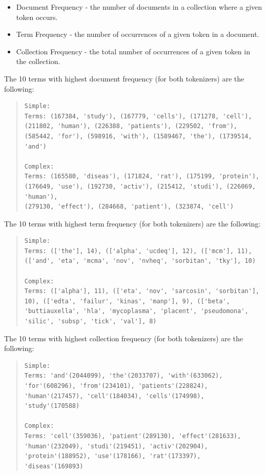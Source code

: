 \documentclass[12pt]{article}
\begin{document}
\begin{itemize}[leftmargin=*]
\setlength\itemsep{-0.3em}
\item Document Frequency - the number of documents in a collection where 
a given token occurs.
\item Term Frequency - the number of occurrences of a given token in a 
document.
\item Collection Frequency - the total number of occurrences of a given 
token in the collection.
\end{itemize}

The 10 terms with highest document frequency (for both tokenizers) are the 
following:

\begingroup
\addtolength\leftmargini{-0.4in}
\addtolength\baselineskip{-0.05in}
\begin{quote}
\begin{verbatim}
Simple:
Terms: (167384, 'study'), (167779, 'cells'), (171278, 'cell'), 
(211802, 'human'), (226388, 'patients'), (229502, 'from'), 
(585442, 'for'), (598916, 'with'), (1589467, 'the'), (1739514, 'and')

Complex:
Terms: (165580, 'diseas'), (171824, 'rat'), (175199, 'protein'), 
(176649, 'use'), (192730, 'activ'), (215412, 'studi'), (226069, 'human'), 
(279130, 'effect'), (284668, 'patient'), (323874, 'cell')
\end{verbatim}
\end{quote}
\endgroup

The 10 terms with highest term frequency (for both tokenizers) are the 
following:

\begingroup
\addtolength\leftmargini{-0.4in}
\addtolength\baselineskip{-0.05in}
\begin{quote}
\begin{verbatim}
Simple:
Terms: (['the'], 14), (['alpha', 'ucdeq'], 12), (['mcm'], 11), (['and', 'eta', 'mcma', 'nov', 'nvheq', 'sorbitan', 'tky'], 10)

Complex:
Terms: (['alpha'], 11), (['eta', 'nov', 'sarcosin', 'sorbitan'], 10), (['edta', 'failur', 'kinas', 'manp'], 9), (['beta', 'buttiauxella', 'hla', 'mycoplasma', 'placent', 'pseudomona', 'silic', 'subsp', 'tick', 'val'], 8)
\end{verbatim}
\end{quote}
\endgroup

The 10 terms with highest collection frequency (for both tokenizers) are the 
following:

\begingroup
\addtolength\leftmargini{-0.4in}
\addtolength\baselineskip{-0.05in}
\begin{quote}
\begin{verbatim}
Simple:
Terms: 'and'(2044099), 'the'(2033707), 'with'(633062), 
'for'(608296), 'from'(234101), 'patients'(228824),
'human'(217457), 'cell'(184034), 'cells'(174998),
'study'(170588)

Complex:
Terms: 'cell'(359036), 'patient'(289130), 'effect'(281633),
'human'(232049), 'studi'(219451), 'activ'(202904),
'protein'(188952), 'use'(178166), 'rat'(173397),
'diseas'(169893)
\end{verbatim}
\end{quote}
\endgroup
\end{document}
